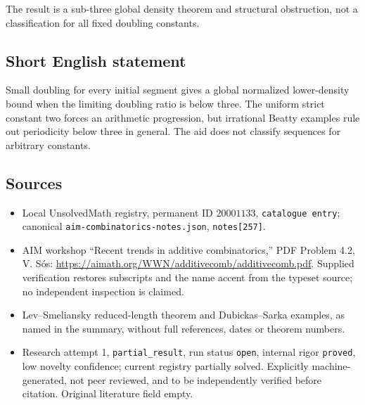 \documentclass[11pt]{article}
\begin{document}
The result is a sub-three global density theorem and structural obstruction, not a classification for all fixed doubling constants.
\subsection{Short English statement}
Small doubling for every initial segment gives a global normalized lower-density bound when the limiting doubling ratio is below three. The uniform strict constant two forces an arithmetic progression, but irrational Beatty examples rule out periodicity below three in general. The aid does not classify sequences for arbitrary constants.
\subsection{Sources}
\begin{itemize}
\item Local UnsolvedMath registry, permanent ID $20001133$, \texttt{catalogue entry}; canonical \texttt{aim-combinatorics-notes.json}, \texttt{notes[257]}.
\item AIM workshop ``Recent trends in additive combinatorics,'' PDF Problem 4.2, V. S\'os: \url{https://aimath.org/WWN/additivecomb/additivecomb.pdf}. Supplied verification restores subscripts and the name accent from the typeset source; no independent inspection is claimed.
\item Lev--Smeliansky reduced-length theorem and Dubickas--Sarka examples, as named in the summary, without full references, dates or theorem numbers.
\item Research attempt 1, \texttt{partial\_result}, run status \texttt{open}, internal rigor \texttt{proved}, low novelty confidence; current registry partially solved. Explicitly machine-generated, not peer reviewed, and to be independently verified before citation. Original literature field empty.
\end{itemize}
\end{document}
